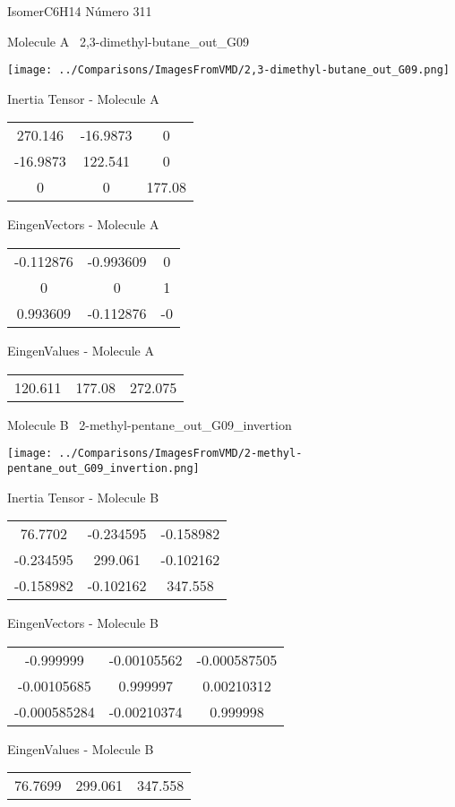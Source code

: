 \vtab[-3cm]
\begin{center}
{\large IsomerC6H14 \tab Número 311}
\end{center}
\begin{multicols}{2}
\begin{center}

Molecule A \
2,3-dimethyl-butane\_out\_G09

\texttt{[image: ../Comparisons/ImagesFromVMD/2,3-dimethyl-butane\_out\_G09.png]}

Inertia Tensor - Molecule A \\
\begin{tabular}{|c c c|}
270.146	 & 	-16.9873	 & 	0	 \\
-16.9873	 & 	122.541	 & 	0	 \\
0	 & 	0	 & 	177.08
\end{tabular}

\vtab
 EingenVectors - Molecule A     \\
\begin{tabular}{|c c c|}
-0.112876	 & 	-0.993609	 & 	0	 \\
0	 & 	0	 & 	1	 \\
0.993609	 & 	-0.112876	 & 	-0
\end{tabular}

\vtab
 EingenValues - Molecule A     \\
\begin{tabular}{|c c c|}
120.611	 & 	177.08	 & 	272.075	 \\
\end{tabular}
\columnbreak

Molecule B \
2-methyl-pentane\_out\_G09\_invertion

\texttt{[image: ../Comparisons/ImagesFromVMD/2-methyl-pentane\_out\_G09\_invertion.png]}

Inertia Tensor - Molecule B \\
\begin{tabular}{|c c c|}
76.7702	 & 	-0.234595	 & 	-0.158982	 \\
-0.234595	 & 	299.061	 & 	-0.102162	 \\
-0.158982	 & 	-0.102162	 & 	347.558
\end{tabular}

\vtab
 EingenVectors - Molecule B     \\
\begin{tabular}{|c c c|}
-0.999999	 & 	-0.00105562	 & 	-0.000587505	 \\
-0.00105685	 & 	0.999997	 & 	0.00210312	 \\
-0.000585284	 & 	-0.00210374	 & 	0.999998
\end{tabular}

\vtab
 EingenValues - Molecule B     \\
\begin{tabular}{|c c c|}
76.7699	 & 	299.061	 & 	347.558	 \\
\end{tabular}

\end{center}
\end{multicols}

